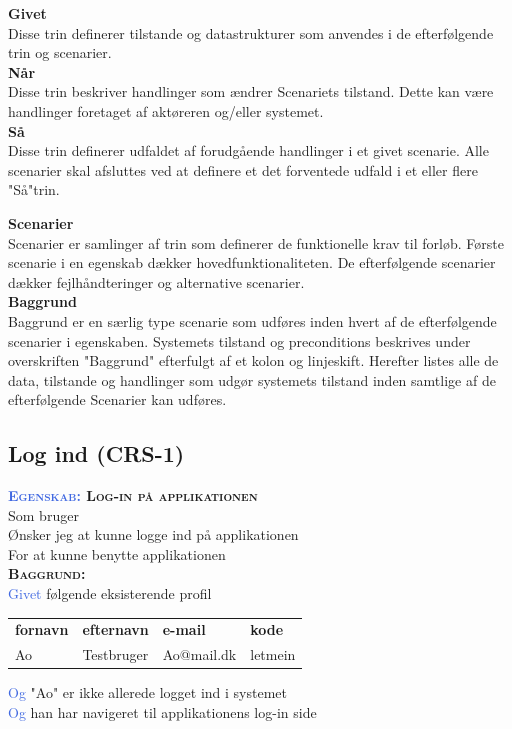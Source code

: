 \large{\textbf{Givet}}\\
Disse trin definerer tilstande og datastrukturer som anvendes i de 
efterfølgende trin og scenarier.\\
\large{\textbf{Når}}\\
Disse trin beskriver handlinger som ændrer Scenariets tilstand. Dette kan 
være handlinger	foretaget af aktøreren og/eller systemet.\\
\large{\textbf{Så}}\\
Disse trin definerer udfaldet af forudgående handlinger i et givet 
scenarie. Alle scenarier skal afsluttes ved at definere et det forventede 
udfald i et eller flere "Så"trin.\\

\clearpage

\large{\textbf{Scenarier}}\\
Scenarier er samlinger af trin som definerer de funktionelle krav til 
forløb. Første scenarie i en egenskab dækker hovedfunktionaliteten. De 
efterfølgende scenarier dækker fejlhåndteringer og alternative scenarier.\\
\large{\textbf{Baggrund}}\\
Baggrund er en særlig type scenarie som udføres inden hvert af de 
efterfølgende scenarier	i egenskaben. Systemets tilstand og preconditions 
beskrives under overskriften "Baggrund" efterfulgt af et kolon og 
linjeskift. Herefter listes alle de data, tilstande og handlinger som udgør 
systemets tilstand inden samtlige af de efterfølgende Scenarier kan	udføres.


\subsection{Log ind (CRS-1)} \label{sec:USLogInd}
\textbf{\textsc{\textcolor{RoyalBlue} {Egenskab:} Log-in på applikationen}} \\
Som bruger\\
Ønsker jeg at kunne logge ind på applikationen\\
For at kunne benytte applikationen\\

\textbf{\textsc{\color{RoyalBlue}Baggrund:}}\\
\textcolor{RoyalBlue}{Givet} følgende eksisterende profil\\
\begin{tabular}{| l | l | l | l |}
	\textbf{fornavn} & \textbf{efternavn} & \textbf{e-mail} & \textbf{kode} \\
	Ao & Testbruger & Ao@mail.dk & letmein\\
\end{tabular}
\newline \newline
\textcolor{RoyalBlue}{Og} "Ao" er ikke allerede logget ind i systemet\\
\textcolor{RoyalBlue}{Og} han har navigeret til applikationens log-in side\\

